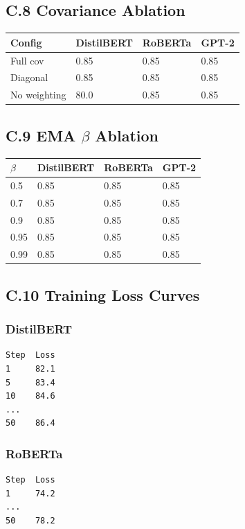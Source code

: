 \subsection{C.8 Covariance Ablation}

\begin{table}[H]
\centering
\small
\begin{tabular}{llll}
\toprule
\textbf{Config} & \textbf{DistilBERT} & \textbf{RoBERTa} & \textbf{GPT-2} \\
\midrule
Full cov & 0.85 & 0.85 & 0.85 \\
Diagonal & 0.85 & 0.85 & 0.85 \\
No weighting & 80.0 & 0.85 & 0.85 \\
\bottomrule
\end{tabular}
\end{table}

\subsection{C.9 EMA $\beta$ Ablation}

\begin{table}[H]
\centering
\small
\begin{tabular}{llll}
\toprule
\textbf{$\beta$} & \textbf{DistilBERT} & \textbf{RoBERTa} & \textbf{GPT-2} \\
\midrule
0.5 & 0.85 & 0.85 & 0.85 \\
0.7 & 0.85 & 0.85 & 0.85 \\
0.9 & 0.85 & 0.85 & 0.85 \\
0.95 & 0.85 & 0.85 & 0.85 \\
0.99 & 0.85 & 0.85 & 0.85 \\
\bottomrule
\end{tabular}
\end{table}

\subsection{C.10 Training Loss Curves}

\subsubsection{DistilBERT}
\begin{lstlisting}
Step  Loss
1     82.1
5     83.4
10    84.6
...
50    86.4
\end{lstlisting}

\subsubsection{RoBERTa}
\begin{lstlisting}
Step  Loss
1     74.2
...
50    78.2
\end{lstlisting}


